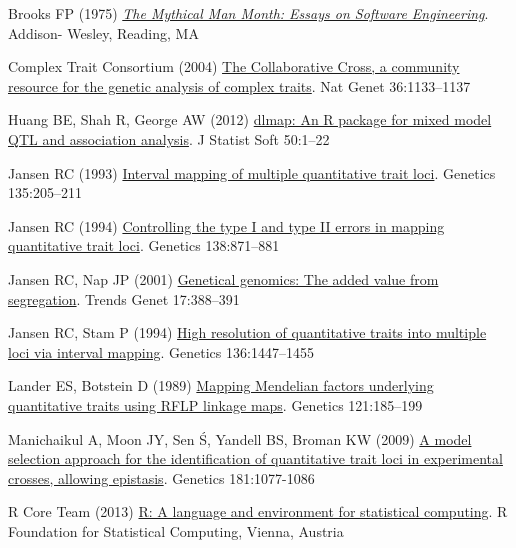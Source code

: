 \documentclass[letterpaper]{article}
\newenvironment{hanging}
{\begin{list}{}
        {\setlength{\labelwidth}{0in}
         \setlength{\leftmargin}{1em}
         \setlength{\itemindent}{-1em}
         \setlength{\parsep}{0in}
         \setlength{\itemsep}{0in}
        }
}
{\end{list}}
\begin{document}
\begin{multicols}{2}
\begin{hanging}
\item Brooks FP (1975)
  \href{http://archive.org/details/mythicalmanmonth00fred}{\emph{The
      Mythical Man Month: Essays on Software Engineering}}. Addison-
  Wesley, Reading, MA

\item Complex Trait Consortium (2004)
  \href{http://www.ncbi.nlm.nih.gov/pubmed/15514660}{The Collaborative
  Cross, a community resource for the genetic analysis of complex
  traits}. Nat Genet 36:1133--1137

\item Huang BE, Shah R, George AW (2012)
  \href{http://www.jstatsoft.org/v50/i06/}{dlmap: An R package for
    mixed model QTL and association analysis}. J Statist Soft 50:1--22

\item Jansen RC (1993)
  \href{http://www.ncbi.nlm.nih.gov/pubmed/8224820}{Interval mapping
    of multiple quantitative trait loci}. Genetics 135:205--211

\item Jansen RC (1994)
  \href{http://www.ncbi.nlm.nih.gov/pubmed/7851782}{Controlling the
    type I and type II errors in mapping quantitative trait
    loci}. Genetics 138:871--881

\item Jansen RC, Nap JP (2001)
  \href{http://www.ncbi.nlm.nih.gov/pubmed/11418218}{Genetical
    genomics: The added value from segregation}. Trends Genet
  17:388--391

\item Jansen RC, Stam P (1994)
  \href{http://www.ncbi.nlm.nih.gov/pubmed/8013917}{High resolution of
    quantitative traits into multiple loci via interval
    mapping}. Genetics 136:1447--1455

\item Lander ES, Botstein D (1989)
  \href{http://www.ncbi.nlm.nih.gov/pubmed/2563713}{Mapping Mendelian
    factors underlying quantitative traits using RFLP linkage
    maps}. Genetics 121:185--199

\item Manichaikul A, Moon JY, Sen \'S, Yandell BS, Broman KW (2009)
  \href{http://www.ncbi.nlm.nih.gov/pubmed/19104078}{A model selection
    approach for the identification of quantitative trait loci in
    experimental crosses, allowing epistasis}. Genetics 181:1077-1086

\item R Core Team (2013) \href{http://www.r-project.org}{R: A language
  and environment for statistical computing}.  R Foundation for
  Statistical Computing, Vienna, Austria


\end{hanging}
\end{multicols}
\end{document}
